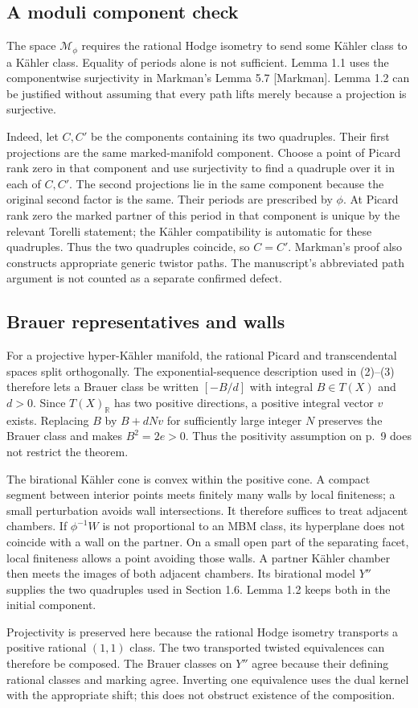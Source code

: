 \documentclass[10pt]{article}
\begin{document}
\subsection*{A moduli component check}
The space \(\mathcal M_\phi\) requires the rational Hodge isometry to send some Kähler class to a Kähler class. Equality of periods alone is not sufficient. Lemma 1.1 uses the componentwise surjectivity in Markman’s Lemma 5.7 [Markman]. Lemma 1.2 can be justified without assuming that every path lifts merely because a projection is surjective.\par
Indeed, let \(C,C'\) be the components containing its two quadruples. Their first projections are the same marked-manifold component. Choose a point of Picard rank zero in that component and use surjectivity to find a quadruple over it in each of \(C,C'\). The second projections lie in the same component because the original second factor is the same. Their periods are prescribed by \(\phi\). At Picard rank zero the marked partner of this period in that component is unique by the relevant Torelli statement; the Kähler compatibility is automatic for these quadruples. Thus the two quadruples coincide, so \(C=C'\). Markman’s proof also constructs appropriate generic twistor paths. The manuscript’s abbreviated path argument is not counted as a separate confirmed defect.\par
\subsection*{Brauer representatives and walls}
For a projective hyper-Kähler manifold, the rational Picard and transcendental spaces split orthogonally. The exponential-sequence description used in (2)–(3) therefore lets a Brauer class be written \([-B/d]\) with integral \(B\in T(X)\) and \(d>0\). Since \(T(X)_\mathbb R\) has two positive directions, a positive integral vector \(v\) exists. Replacing \(B\) by \(B+dNv\) for sufficiently large integer \(N\) preserves the Brauer class and makes \(B^2=2e>0\). Thus the positivity assumption on p. 9 does not restrict the theorem.\par
The birational Kähler cone is convex within the positive cone. A compact segment between interior points meets finitely many walls by local finiteness; a small perturbation avoids wall intersections. It therefore suffices to treat adjacent chambers. If \(\phi^{-1}W\) is not proportional to an MBM class, its hyperplane does not coincide with a wall on the partner. On a small open part of the separating facet, local finiteness allows a point avoiding those walls. A partner Kähler chamber then meets the images of both adjacent chambers. Its birational model \(Y''\) supplies the two quadruples used in Section 1.6. Lemma 1.2 keeps both in the initial component.\par
Projectivity is preserved here because the rational Hodge isometry transports a positive rational \((1,1)\) class. The two transported twisted equivalences can therefore be composed. The Brauer classes on \(Y''\) agree because their defining rational classes and marking agree. Inverting one equivalence uses the dual kernel with the appropriate shift; this does not obstruct existence of the composition.\par
\end{document}
